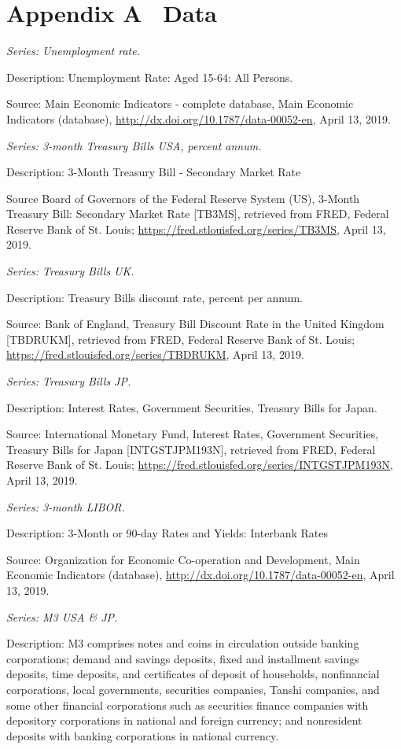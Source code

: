 
\section*{Appendix A \textendash \ Data}
\label{app:A}

\textit{Series: Unemployment rate.}

Description: Unemployment Rate: Aged 15-64: All Persons.

Source: Main Economic Indicators - complete database, Main Economic Indicators (database),  \url{http://dx.doi.org/10.1787/data-00052-en}, April 13, 2019.

\textit{Series: 3-month Treasury Bills USA, percent annum.}

Description: 3-Month Treasury Bill - Secondary Market Rate 

Source Board of Governors of the Federal Reserve System (US), 3-Month Treasury Bill: Secondary Market Rate [TB3MS], retrieved from FRED, Federal Reserve Bank of St. Louis; \url{https://fred.stlouisfed.org/series/TB3MS}, April 13, 2019.


\textit{Series: Treasury Bills UK.}

Description: Treasury Bills discount rate, percent per annum.

Source: Bank of England, Treasury Bill Discount Rate in the United Kingdom [TBDRUKM], retrieved from FRED, Federal Reserve Bank of St. Louis; \url{https://fred.stlouisfed.org/series/TBDRUKM}, April 13, 2019.


\textit{Series: Treasury Bills JP.}

Description: Interest Rates, Government Securities, Treasury Bills for Japan.

Source: International Monetary Fund, Interest Rates, Government Securities, Treasury Bills for Japan [INTGSTJPM193N], retrieved from FRED, Federal Reserve Bank of St. Louis; \url{https://fred.stlouisfed.org/series/INTGSTJPM193N}, April 13, 2019.

\textit{Series: 3-month LIBOR.}

Description: 3-Month or 90-day Rates and Yields: Interbank Rates

Source: Organization for Economic Co-operation and Development, Main Economic Indicators (database), \url{http://dx.doi.org/10.1787/data-00052-en}, April 13, 2019.

\textit{Series: M3 USA \& JP.}

Description: M3 comprises notes and coins in circulation outside banking corporations; demand and savings deposits, fixed and installment savings deposits, time deposits, and certificates of deposit of households, nonfinancial corporations, local governments, securities companies, Tanshi companies, and some other financial corporations such as securities finance companies with depository corporations in national and foreign currency; and nonresident deposits with banking corporations in national currency. 

